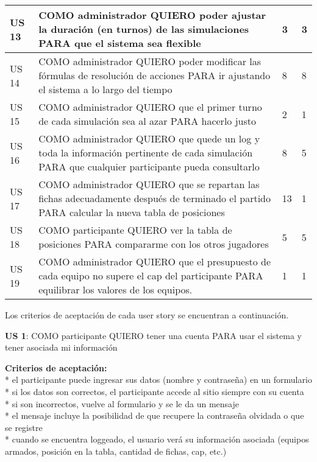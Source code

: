 \begin{center}
\begin{tabular}{| l | p{10cm} | l | l | }
US 13 & COMO administrador QUIERO poder ajustar la duración (en turnos) de las simulaciones PARA que el sistema sea flexible & 3 & 3\\  \hline
US 14 & COMO administrador QUIERO poder modificar las fórmulas de resolución de acciones PARA ir ajustando el sistema a lo largo del tiempo & 8 & 8\\  \hline
US 15 & COMO administrador QUIERO que el primer turno de cada simulación sea al azar PARA hacerlo justo & 2 & 1\\  \hline
US 16 & COMO administrador QUIERO que quede un log y toda la información pertinente de cada simulación PARA que cualquier participante pueda consultarlo & 8 & 5\\  \hline
US 17 & COMO administrador QUIERO que se repartan las fichas adecuadamente después de terminado el partido PARA calcular la nueva tabla de posiciones & 13 & 1\\  \hline
US 18 & COMO participante QUIERO ver la tabla de posiciones PARA compararme con los otros jugadores & 5 & 5\\  \hline
US 19 & COMO administrador QUIERO que el presupuesto de cada equipo no supere el cap del participante PARA equilibrar los valores de los equipos. & 1 & 1\\  \hline
  \end{tabular}
\end{center}

Los criterios de aceptación de cada user story se encuentran a continuación.


\begin{tcolorbox}
\textbf{US 1}: COMO participante QUIERO tener una cuenta PARA usar el sistema y tener asociada mi información

\vline

\textbf{Criterios de aceptación:}\\
  * el participante puede ingresar sus datos (nombre y contraseña) en un formulario	\\
  * si los datos son correctos, el participante accede al sitio siempre con su cuenta	\\
  * si son incorrectos, vuelve al formulario y se le da un mensaje	\\
  * el mensaje incluye la posibilidad de que recupere la contraseña olvidada o que se registre	\\
  * cuando se encuentra loggeado, el usuario verá su información asociada (equipos armados, posición en la tabla, cantidad de fichas, cap, etc.)	\\
\end{tcolorbox}
\vspace{10pt}

